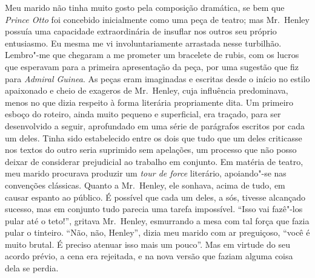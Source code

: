 Meu marido não tinha muito gosto pela composição dramática, se bem que
\textit{Prince Otto} foi concebido inicialmente como uma peça de
teatro; mas Mr.~Henley possuía uma capacidade extraordinária de
insuflar nos outros seu próprio entusiasmo.  Eu mesma me vi
involuntariamente arrastada nesse turbilhão.  Lembro"-me que chegaram a
me prometer um bracelete de rubis, com os lucros que esperavam para a
primeira apresentação da peça, por uma sugestão que fiz para
\textit{Admiral Guinea}.  As peças eram imaginadas e escritas desde o
início no estilo apaixonado e cheio de exageros de Mr.~Henley, cuja
influência predominava, menos no que dizia respeito à forma literária
propriamente dita.  Um primeiro esboço do roteiro, ainda muito pequeno
e superficial, era traçado, para ser desenvolvido a seguir, aprofundado
em uma série de parágrafos escritos por cada um deles.  Tinha sido
estabelecido entre os dois que tudo que um deles criticasse nos textos
do outro seria suprimido sem apelações, um processo que não posso
deixar de considerar prejudicial ao trabalho em conjunto.  Em matéria
de teatro, meu marido procurava produzir um \textit{tour de force}
literário, apoiando"-se nas convenções clássicas.  Quanto a Mr.~Henley,
ele sonhava, acima de tudo, em causar espanto ao público.  É possível que
cada um deles, a sós, tivesse alcançado sucesso, mas em conjunto
tudo parecia uma tarefa impossível. “Isso vai fazê"-los pular até o		      
teto!”, gritava Mr.~Henley, esmurrando a mesa com tal força que fazia
pular o tinteiro. “Não, não, Henley”, dizia meu marido com ar
preguiçoso, “você é muito brutal. É preciso atenuar isso mais um
pouco”.  Mas em virtude do seu acordo prévio, a cena era rejeitada, e
na nova versão que faziam alguma coisa dela se perdia.

